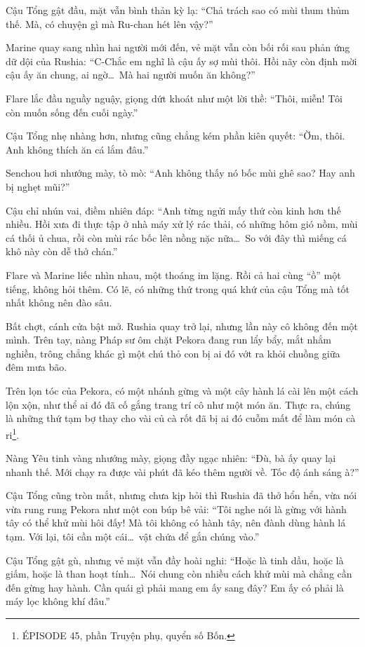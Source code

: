 \documentclass[../main.tex]{subfiles}
\begin{document}
Cậu Tổng gật đầu, mặt vẫn bình thản kỳ lạ: ``Chả trách sao có mùi thum thủm thế. Mà, có chuyện gì mà Ru-chan hét lên vậy?''

Marine quay sang nhìn hai người mới đến, vẻ mặt vẫn còn bối rối sau phản ứng dữ dội của Rushia: ``C-Chắc em nghĩ là cậu ấy sợ mùi thôi. Hồi nãy còn định mời cậu ấy ăn chung, ai ngờ\dots\ Mà hai người muốn ăn không?''

Flare lắc đầu nguầy nguậy, giọng dứt khoát như một lời thề: ``Thôi, miễn! Tôi còn muốn sống đến cuối ngày.''

Cậu Tổng nhẹ nhàng hơn, nhưng cũng chẳng kém phần kiên quyết: ``Ờm, thôi. Anh không thích ăn cá lắm đâu.''

Senchou hơi nhướng mày, tò mò: ``Anh không thấy nó bốc mùi ghê sao? Hay anh bị nghẹt mũi?''

Cậu chỉ nhún vai, điềm nhiên đáp: ``Anh từng ngửi mấy thứ còn kinh hơn thế nhiều. Hồi xưa đi thực tập ở nhà máy xử lý rác thải, có những hôm gió nồm, mùi cá thối ủ chua, rồi còn mùi rác bốc lên nồng nặc nữa\dots\ So với đây thì miếng cá khô này còn dễ thở chán.''

Flare và Marine liếc nhìn nhau, một thoáng im lặng. Rồi cả hai cùng ``ồ'' một tiếng, không hỏi thêm. Có lẽ, có những thứ trong quá khứ của cậu Tổng mà tốt nhất không nên đào sâu.

\ct

Bất chợt, cánh cửa bật mở. Rushia quay trở lại, nhưng lần này cô không đến một mình. Trên tay, nàng Pháp sư ôm chặt Pekora đang run lẩy bẩy, mắt nhắm nghiền, trông chẳng khác gì một chú thỏ con bị ai đó vớt ra khỏi chuồng giữa đêm mưa bão.

Trên lọn tóc của Pekora, có một nhánh gừng và một cây hành lá cài lên một cách lộn xộn, như thể ai đó đã cố gắng trang trí cô như một món ăn. Thực ra, chúng là những thứ tạm bợ thay cho vài củ cà rốt đã bị ai đó cuỗm mất để làm món cà ri\footnote{{\flaregothic ÉPISODE 45}, phần {\abv Truyện phụ}, quyển số Bốn.}.

Nàng Yêu tinh vàng nhướng mày, giọng đầy ngạc nhiên: ``Đù, bà ấy quay lại nhanh thế. Mới chạy ra được vài phút đã kéo thêm người về. Tốc độ ánh sáng à?''

Cậu Tổng cũng tròn mắt, nhưng chưa kịp hỏi thì Rushia đã thở hổn hển, vừa nói vừa rung rung Pekora như một con búp bê vải: ``Tôi nghe nói là gừng với hành tây có thể khử mùi hôi đấy! Mà tôi không có hành tây, nên đành dùng hành lá tạm. Với lại, tôi cần một cái\dots\ vật chứa để gắn chúng vào.''

Cậu Tổng gật gù, nhưng vẻ mặt vẫn đầy hoài nghi: ``Hoặc là tinh dầu, hoặc là giấm, hoặc là than hoạt tính\dots\ Nói chung còn nhiều cách khử mùi mà chẳng cần đến gừng hay hành. Cần quái gì phải mang em ấy sang đây? Em ấy có phải là máy lọc không khí đâu.''
\end{document}

